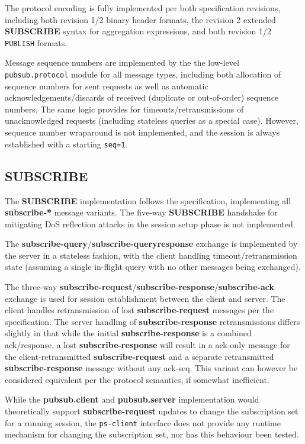\documentclass[a4paper]{article}
\begin{document}
The protocol encoding is fully implemented per both specification revisions, including both revision 1/2 binary header formats, the revision 2 extended \textbf{SUBSCRIBE} syntax for aggregation expressions, and both revision 1/2 \texttt{PUBLISH} formats.

Message sequence numbers are implemented by the the low-level \texttt{pubsub.protocol} module for all message types, including both allocation of sequence numbers for sent requests as well as automatic acknowledgements/discards of received (duplicate or out-of-order) sequence numbers.
The same logic provides for timeouts/retransmissions of unacknowledged requests (including stateless queries as a special case).
However, sequence number wraparound is not implemented, and the session is always established with a starting \texttt{seq=1}.

\subsection{\textbf{SUBSCRIBE}}
The \textbf{SUBSCRIBE} implementation follows the specification, implementing all \textbf{subscribe-*} message variants.
The five-way \textbf{SUBSCRIBE} handshake for mitigating DoS reflection attacks in the session setup phase is not implemented.

The \textbf{subscribe-query}/\textbf{subscribe-queryresponse} exchange is implemented by the server in a stateless fashion, with the client handling timeout/retransmission state (assuming a single in-flight query with no other messages being exchanged).

The three-way \textbf{subscribe-request}/\textbf{subscribe-response}/\textbf{subscribe-ack} exchange is used for session establishment between the client and server.
The client handles retransmission of lost \textbf{subscribe-request} messages per the specification.
The server handling of \textbf{subscribe-response} retransmissions differs slightly in that while the initial \textbf{subscribe-response} is a combined ack/response, a lost \textbf{subscribe-response} will result in a ack-only message for the client-retransmitted \textbf{subscribe-request} and a separate retransmitted \textbf{subscribe-response} message without any ack-seq.
This variant can however be considered equivalent per the protocol semantics, if somewhat inefficient.

While the \textbf{pubsub.client} and \textbf{pubsub.server} implementation would theoretically support \textbf{subscribe-request} updates to change the subscription set for a running session, the \texttt{ps-client} interface does not provide any runtime mechanism for changing the subscription set, nor has this behaviour been tested.
\end{document}
